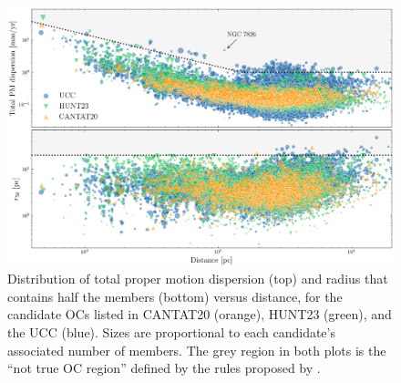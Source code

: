 \documentclass[fleqn,usenatbib]{mnras}
\begin{document}
\begin{figure}
	\includegraphics[width=\textwidth]{figs/pms_plx.png}
    \caption{Distribution of total proper motion dispersion (top) and radius
    that contains half the members (bottom) versus distance, for the candidate
    OCs listed in CANTAT20 (orange), HUNT23 (green), and the UCC (blue).
    Sizes are proportional to each candidate's associated number of members.
    The grey region in both plots is the ``not true OC region'' defined by
    the rules proposed by \citet{Cantat-Anders_2020}.}
    \label{fig:pms_plx}
\end{figure}
\end{document}
